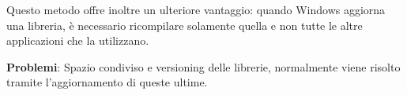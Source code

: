 Questo metodo offre inoltre un ulteriore vantaggio: quando Windows aggiorna una libreria, è necessario ricompilare solamente quella e non tutte le altre applicazioni che la utilizzano.


\textbf{Problemi}: Spazio condiviso e versioning delle librerie, normalmente viene risolto tramite l'aggiornamento di queste ultime.















